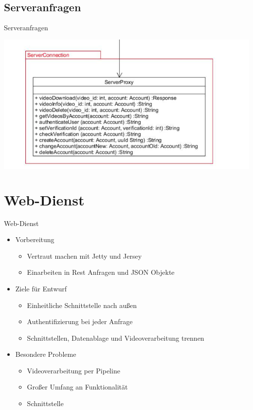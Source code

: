 \documentclass[19pt]{beamer}
\begin{document}
\subsection{Serveranfragen}
\begin{frame}{Serveranfragen}
\begin{center}
\includegraphics[scale=0.35]{resources/interface_serverconnection.png}
\end{center}
\end{frame}


\section{Web-Dienst}
\begin{frame}{Web-Dienst}
	\begin{itemize}
		\item Vorbereitung
		\begin{itemize}
			\item Vertraut machen mit Jetty und Jersey
			\pause
			\item Einarbeiten in Rest Anfragen und JSON Objekte
			\pause
		\end{itemize}
		\item Ziele für Entwurf
		\begin{itemize}
			\item Einheitliche Schnittstelle nach außen
			\pause
			\item Authentifizierung bei jeder Anfrage
			\pause
			\item Schnittstellen, Datenablage und Videoverarbeitung trennen
			\pause
		\end{itemize}
		\item Besondere Probleme
		\begin{itemize}
			\item Videoverarbeitung per Pipeline
			\pause
			\item Großer Umfang an Funktionalität
			\pause
			\item Schnittstelle
		\end{itemize}
	\end{itemize}
\end{frame}
\end{document}
